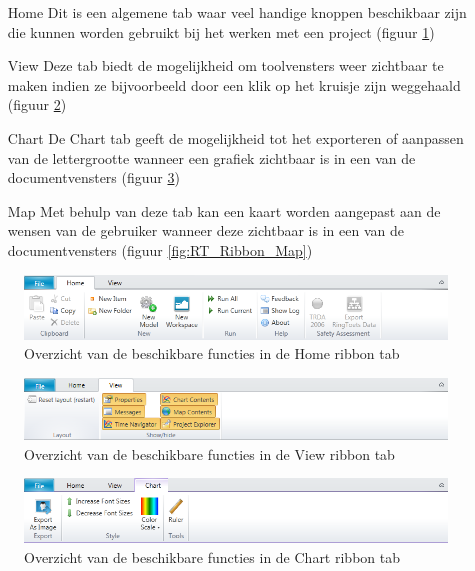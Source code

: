 \begin{itemize}
	\item[Home] Dit is een algemene tab waar veel handige knoppen beschikbaar zijn die kunnen worden gebruikt bij het werken met een project (figuur \ref{fig:rt_Ribbon_Home})
	\item[View] Deze tab biedt de mogelijkheid om toolvensters weer zichtbaar te maken indien ze bijvoorbeeld door een klik op het kruisje zijn weggehaald (figuur \ref{fig:rt_Ribbon_View})
	\item[Chart] De Chart tab geeft de mogelijkheid tot het exporteren of aanpassen van de lettergrootte wanneer een grafiek zichtbaar is in een van de documentvensters (figuur \ref{fig:rt_Ribbon_Chart})
	\item[Map] Met behulp van deze tab kan een kaart worden aangepast aan de wensen van de gebruiker wanneer deze zichtbaar is in een van de documentvensters (figuur \ref{fig:RT_Ribbon_Map})
\end{itemize}

\begin{figure}[H]
	\centering
		\includegraphics[width=1.0\textwidth]{figures/chapter_general/rt_Home.png}
		\caption{Overzicht van de beschikbare functies in de Home ribbon tab}
	\label{fig:rt_Ribbon_Home}
\end{figure}

\begin{figure}[H]
	\centering
		\includegraphics[width=1.0\textwidth]{figures/chapter_general/rt_View.png}
		\caption{Overzicht van de beschikbare functies in de View ribbon tab}
	\label{fig:rt_Ribbon_View}
\end{figure}

\begin{figure}[H]
	\centering
		\includegraphics[width=1.0\textwidth]{figures/chapter_general/rt_Chart.png}
		\caption{Overzicht van de beschikbare functies in de Chart ribbon tab}
	\label{fig:rt_Ribbon_Chart}
\end{figure}

